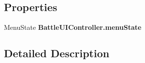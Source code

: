 \subsection*{Properties}
\begin{DoxyCompactItemize}
\item 
\hypertarget{group__client_ga4f8584c7f4ebdeb9b29bf982dc8a5e5d}{Menu\-State {\bfseries Battle\-U\-I\-Controller.\-menu\-State}}\label{group__client_ga4f8584c7f4ebdeb9b29bf982dc8a5e5d}

\end{DoxyCompactItemize}


\subsection{Detailed Description}
